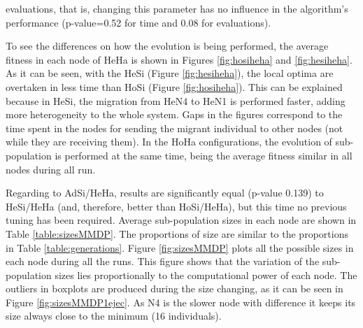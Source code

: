 \documentclass[final,1p,times]{elsarticle}
\begin{document}
 evaluations, that is, changing this parameter has no influence in the
 algorithm's performance (p-value=0.52 for time and 0.08 for evaluations).











To see the differences on how the evolution is being performed, the average fitness in each node of HeHa is shown in Figures \ref{fig:hosiheha} and \ref{fig:hesiheha}. As it can be seen, with the HeSi (Figure \ref{fig:hesiheha}), the local optima are overtaken in less time than HoSi (Figure \ref{fig:hosiheha}).  This can be explained because in HeSi, the migration from HeN4 to HeN1 is performed faster, adding more heterogeneity to the whole system. Gaps in the figures correspond to the time spent in the nodes for sending the migrant individual to other nodes (not while they are receiving them). In the HoHa configurations, the evolution of sub-population is performed at the same time, being the average fitness similar in all nodes during all run. %



Regarding to AdSi/HeHa, results are significantly  equal (p-value 0.139) to HeSi/HeHa (and, therefore, better than HoSi/HeHa), but this time no previous tuning has been required.  Average sub-population sizes in each node are shown in Table \ref{table:sizesMMDP}. The proportions of size are similar to the proportions in Table \ref{table:generations}. Figure \ref{fig:sizesMMDP} plots all the possible sizes in each node during all the runs. This figure shows that the variation of the sub-population sizes lies proportionally to the computational power of each node. The outliers in boxplots are produced during the size changing, as it can be seen in Figure \ref{fig:sizesMMDP1ejec}. As N4 is the slower node with difference it keeps its size always close to the minimum (16 individuals).


\begin{table}
\end{table}
\end{document}
